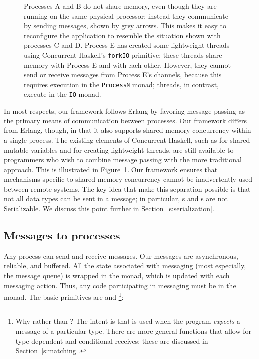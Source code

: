 \documentclass[preprint]{sigplanconf}
\begin{document}
\begin{figure}[!b]
{}
\caption{ 
\label{fig:ProcessBubbles}
Processes A and B do not share memory, even though they are running on the same physical processor; instead they communicate by sending messages, shown by grey arrows.  This makes it easy to reconfigure the application to resemble the situation shown with processes C and D.  Process E has created some lightweight threads using Concurrent Haskell's \texttt{forkIO} primitive; these threads share memory with Process E and with each other.  However, they cannot send or receive messages from Process E's channels, because this requires execution in the \texttt{ProcessM} monad; threads, in contrast, execute in the \texttt{IO} monad.
}
\end{figure}

In most respects, our framework follows Erlang by favoring message-passing as the primary means of communication between processes. Our framework differs from Erlang, though, in that it also supports shared-memory concurrency within a single process. The existing elements of Concurrent Haskell, such as  for shared mutable variables and  for creating lightweight threads, are still available to programmers who wish to combine message passing with the more traditional approach. This is illustrated in Figure~\ref{fig:ProcessBubbles}. Our framework ensures that mechanisms specific to shared-memory concurrency cannot be inadvertently used between remote systems.  The key idea that make this separation possible is that not all data types can be sent in a message; in particular, s and s are not Serializable.
We discuss this point further in Section~\ref{s:serialization}.

\subsection{Messages to processes}

Any process can send and receive messages. Our messages are asynchronous, reliable, and buffered.  All the state associated with messaging (most especially, the message queue) is wrapped in the  monad, which is updated with each messaging action. Thus, any code participating in messaging must be in the  monad.  The basic primitives are  and \footnote{Why  rather than ?  The intent is that  is used when the program \emph{expects} a message of a particular type.  
There are more general  functions that allow for type-dependent and conditional receives;  these are discussed in Section~\ref{s:matching}.}:
\end{document}

